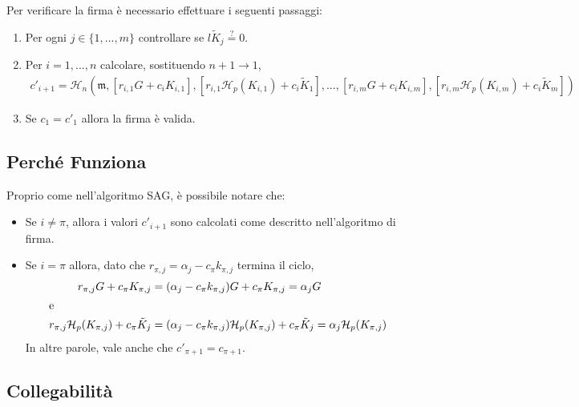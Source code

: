 Per verificare la firma è necessario effettuare i seguenti passaggi:

\begin{enumerate}
    \item Per ogni \(j \in \{1,...,m\}\) controllare se \(l \tilde{K}_j \stackrel{?}{=} 0\).
    \item Per \(i = 1, ..., n\) calcolare, sostituendo \(n + 1 \rightarrow 1\),\vspace{.175cm}
    \begin{align*}
    c'_{i+1} = \mathcal{H}_n(\mathfrak{m}, [r_{i, 1} G + c_i K_{i, 1}], [r_{i, 1} \mathcal{H}_p(K_{i, 1}) + c_i \tilde{K}_1], 
    ..., [r_{i, m} G + c_i K_{i, m}], [r_{i, m} \mathcal{H}_p(K_{i, m}) + c_i \tilde{K}_m])
    \end{align*}

    \item Se \(c_1 = c'_1\) allora la firma è valida.
\end{enumerate}


\subsection*{Perché Funziona}

Proprio come nell’algoritmo SAG, è possibile notare che:

\begin{itemize}
    \item Se \(i \ne \pi \), allora i valori \(c'_{i + 1}\) sono calcolati come descritto nell’algoritmo di firma.

    \item Se \(i = \pi\) allora, dato che \(r_{\pi, j} = \alpha_j - c_\pi k_{\pi, j}\) termina il ciclo,\vspace{.175cm}
    \begin{alignat*}{6}
        r_{\pi, j} G + c_\pi K_{\pi,j} &= (\alpha_j - c_\pi k_{\pi, j}) G + c_\pi K_{\pi,j} = \alpha_j G\\
        \intertext{e}
        r_{\pi, j} \mathcal{H}_p(K_{\pi, j}) + c_\pi \tilde{K}_j &= (\alpha_j - c_\pi k_{\pi, j}) \mathcal{H}_p(K_{\pi, j}) + c_\pi \tilde{K}_j = \alpha_j \mathcal{H}_p(K_{\pi, j})\\
    \end{alignat*}
    In altre parole, vale anche che \(c'_{\pi + 1} = c_{\pi+1}\).
\end{itemize}


\subsection*{Collegabilità}

